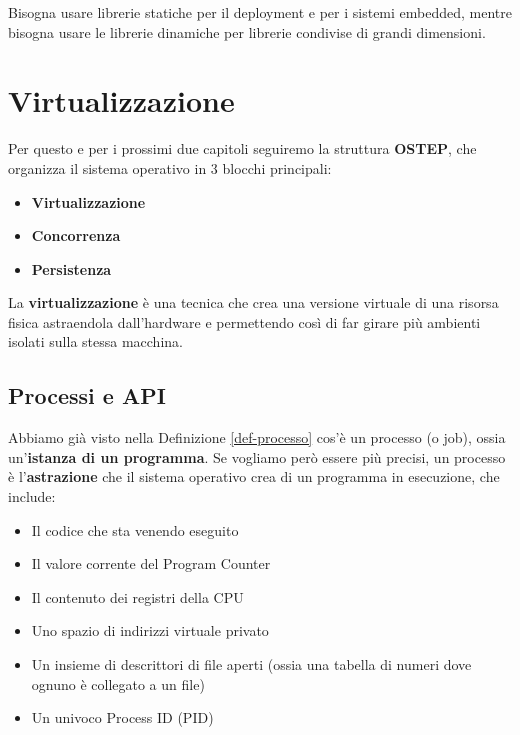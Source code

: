 \documentclass[11pt, a4paper, titlepage, oneside]{scrbook}
\begin{document}
Bisogna usare librerie statiche per il deployment e per i sistemi embedded, mentre bisogna usare le librerie dinamiche per librerie condivise di grandi dimensioni.

\chapter{Virtualizzazione}

\NB Per questo e per i prossimi due capitoli seguiremo la struttura \textbf{OSTEP}, che organizza il sistema operativo in 3 blocchi principali:

\begin{itemize}
    \item \textbf{Virtualizzazione}
    \item \textbf{Concorrenza}
    \item \textbf{Persistenza}
\end{itemize}

\begin{Definizione}[Virtualizzazione]
\label{def-virtualizzazione}
La \textbf{virtualizzazione} è una tecnica che crea una versione virtuale di una risorsa fisica astraendola dall'hardware e permettendo così di far girare più ambienti isolati sulla stessa macchina.
\end{Definizione}

\section{Processi e API}

Abbiamo già visto nella Definizione \ref{def-processo} cos'è un processo (o job), ossia un'\textbf{istanza di un programma}. Se vogliamo però essere più precisi, un processo è l'\textbf{astrazione} che il sistema operativo crea di un programma in esecuzione, che include:
\begin{itemize}
    \item Il codice che sta venendo eseguito
    \item Il valore corrente del Program Counter
    \item Il contenuto dei registri della CPU
    \item Uno spazio di indirizzi virtuale privato
    \item Un insieme di descrittori di file aperti (ossia una tabella di numeri dove ognuno è collegato a un file)
    \item Un univoco Process ID (PID)
\end{itemize}
\end{document}
